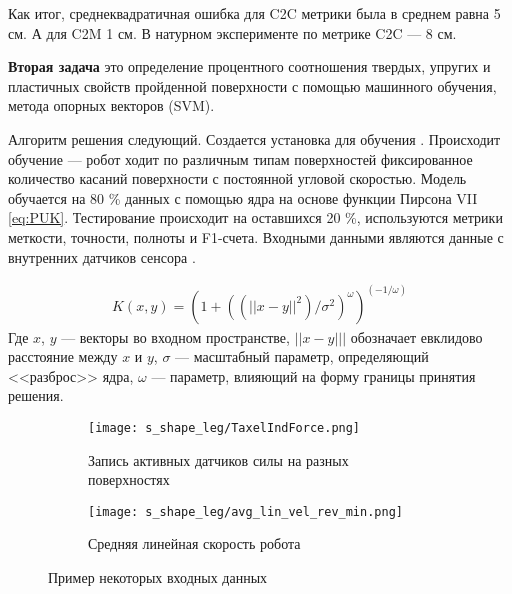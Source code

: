 Как итог, среднеквадратичная ошибка для C2C метрики была в среднем равна 5 см. А для C2M 1 см. В натурном эксперименте по метрике C2C --- 8 см.

\textbf{Вторая задача} это определение процентного соотношения твердых, упругих и пластичных свойств пройденной поверхности с помощью машинного обучения, метода опорных векторов (SVM). 

Алгоритм решения следующий. Создается установка для обучения . Происходит обучение --- робот ходит по различным типам поверхностей фиксированное количество касаний поверхности с постоянной угловой скоростью. Модель обучается на 80 \% данных с помощью ядра на основе функции Пирсона VII  \eqref{eq:PUK}. Тестирование происходит на оставшихся 20 \%, используются метрики меткости, точности, полноты и F1-счета. Входными данными являются данные с внутренних датчиков сенсора .


\begin{align}
    \label{eq:PUK}
    K(x, y) = (1 + ((||x - y||^2)/\sigma^2)^\omega)^{(-1/\omega)}
\end{align}
Где $x$, $y$ --- векторы во входном пространстве, $||x - y|||$ обозначает евклидово расстояние между $x$ и $y$, $\sigma$ --- масштабный параметр, определяющий <<разброс>> ядра, $\omega$ --- параметр, влияющий на форму границы принятия решения.

\begin{figure}[h]
    \begin{subfigure}{0.54\textwidth}
        \centering\texttt{[image: s\_shape\_leg/TaxelIndForce.png]}
        \caption{Запись активных датчиков силы на разных поверхностях}
        \label{fig:s_shape_leg/TaxelIndForce_full.png}
    \end{subfigure}
    \begin{subfigure}{0.45\textwidth}
        \centering\texttt{[image: s\_shape\_leg/avg\_lin\_vel\_rev\_min.png]}
        \caption{Средняя линейная скорость робота}
        \label{fig:s_shape_leg/avg_lin_vel_rev_min.png}
    \end{subfigure}

\caption{Пример некоторых входных данных}
\label{fig:example_input}
\end{figure}

